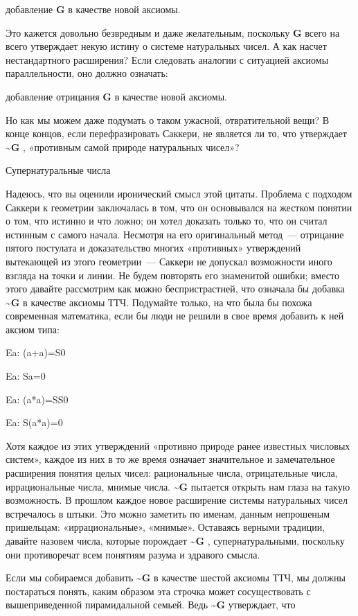 \documentclass[../main.tex]{subfiles}
\begin{document}
добавление \textbf{G} в качестве новой аксиомы.

Это кажется довольно безвредным и даже желательным, поскольку \textbf{G} всего на всего утверждает некую истину о системе натуральных чисел. А как насчет нестандартного расширения? Если следовать аналогии с ситуацией аксиомы параллельности, оно должно означать:

добавление отрицания \textbf{G} в качестве новой аксиомы.

Но как мы можем даже подумать о таком ужасной, отвратительной вещи? В конце концов, если перефразировать Саккери, не является ли то, что утверждает \textbf{\textasciitilde G} , «противным самой природе натуральных чисел»?

Супернатуральные числа

Надеюсь, что вы оценили иронический смысл этой цитаты. Проблема с подходом Саккери к геометрии заключалась в том, что он основывался на жестком понятии о том, что истинно и что ложно; он хотел доказать только то, что он считал истинным с самого начала. Несмотря на его оригинальный метод~--- отрицание пятого постулата и доказательство многих «противных» утверждений вытекающей из этого геометрии~--- Саккери не допускал возможности иного взгляда на точки и линии. Не будем повторять его знаменитой ошибки; вместо этого давайте рассмотрим как можно беспристрастней, что означала бы добавка \textbf{\textasciitilde G} в качестве аксиомы ТТЧ\@. Подумайте только, на что была бы похожа современная математика, если бы люди не решили в свое время добавить к ней аксиом типа:

Ea: (a+a)=S0

Ea: Sa=0

Ea: (a*a)=SS0

Ea: S(a*a)=0

Хотя каждое из этих утверждений «противно природе ранее известных числовых систем», каждое из них в то же время означает значительное и замечательное расширения понятия целых чисел: рациональные числа, отрицательные числа, иррациональные числа, мнимые числа. \textbf{\textasciitilde G} пытается открыть нам глаза на такую возможность. В прошлом каждое новое расширение системы натуральных чисел встречалось в штыки. Это можно заметить по именам, данным непрошеным пришельцам: «иррациональные», «мнимые». Оставаясь верными традиции, давайте назовем числа, которые порождает \textbf{\textasciitilde G} , супернатуральными, поскольку они противоречат всем понятиям разума и здравого смысла.

Если мы собираемся добавить \textbf{\textasciitilde G} в качестве шестой аксиомы ТТЧ, мы должны постараться понять, каким образом эта строчка может сосуществовать с вышеприведенной пирамидальной семьей. Ведь \textbf{\textasciitilde G} утверждает, что
\end{document}
